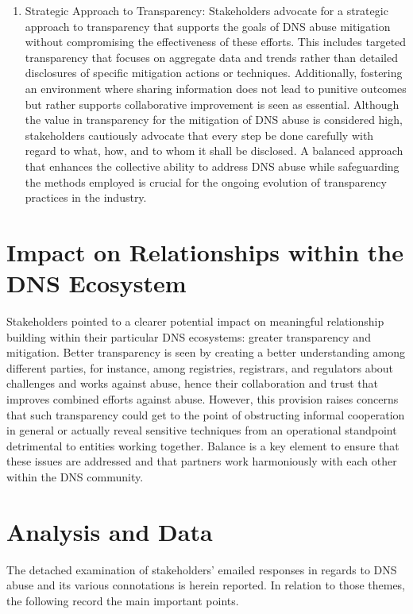 \begin{enumerate}
    \item Strategic Approach to Transparency: Stakeholders advocate for a strategic approach to transparency that supports the goals of DNS abuse mitigation without compromising the effectiveness of these efforts. This includes targeted transparency that focuses on aggregate data and trends rather than detailed disclosures of specific mitigation actions or techniques. Additionally, fostering an environment where sharing information does not lead to punitive outcomes but rather supports collaborative improvement is seen as essential. Although the value in transparency for the mitigation of DNS abuse is considered high, stakeholders cautiously advocate that every step be done carefully with regard to what, how, and to whom it shall be disclosed. A balanced approach that enhances the collective ability to address DNS abuse while safeguarding the methods employed is crucial for the ongoing evolution of transparency practices in the industry.

\end{enumerate}

\section{Impact on Relationships within the DNS Ecosystem} 

 Stakeholders pointed to a clearer potential impact on meaningful relationship building within their particular DNS ecosystems: greater transparency and mitigation. Better transparency is seen by creating a better understanding among different parties, for instance, among registries, registrars, and regulators about challenges and works against abuse, hence their collaboration and trust that improves combined efforts against abuse. However, this provision raises concerns that such transparency could get to the point of obstructing informal cooperation in general or actually reveal sensitive techniques from an operational standpoint detrimental to entities working together. Balance is a key element to ensure that these issues are addressed and that partners work harmoniously with each other within the DNS community.

\section{Analysis and Data } 

The detached examination of stakeholders' emailed responses in regards to DNS abuse and its various connotations is herein reported. In relation to those themes, the following record the main important points.


